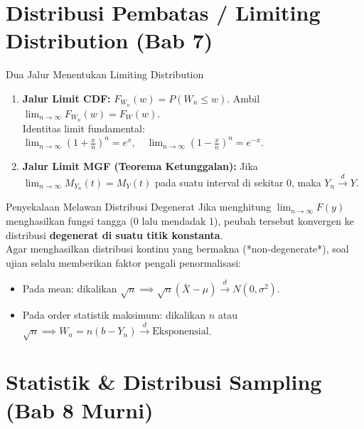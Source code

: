 \documentclass[10pt,twoside]{article}
\begin{document}
\section{Distribusi Pembatas / Limiting Distribution (Bab 7)}

\begin{teoribox}{Dua Jalur Menentukan Limiting Distribution}
\begin{enumerate}
  \item \textbf{Jalur Limit CDF:} $F_{W_n}(w) = P(W_n \le w)$. Ambil $\lim_{n \to \infty} F_{W_n}(w) = F_W(w)$.\\
  Identitas limit fundamental: $\lim_{n \to \infty} \left(1 + \frac{x}{n}\right)^n = e^x, \quad \lim_{n \to \infty} \left(1 - \frac{x}{n}\right)^n = e^{-x}$.
  \item \textbf{Jalur Limit MGF (Teorema Ketunggalan):}
  Jika $\lim_{n \to \infty} M_{Y_n}(t) = M_Y(t)$ pada suatu interval di sekitar 0, maka $Y_n \xrightarrow{d} Y$.
\end{enumerate}
\end{teoribox}

\begin{warningbox}{Penyekalaan Melawan Distribusi Degenerat}
Jika menghitung $\lim_{n \to \infty} F(y)$ menghasilkan fungsi tangga (0 lalu mendadak 1), peubah tersebut konvergen ke distribusi \textbf{degenerat di suatu titik konstanta}.\\
Agar menghasilkan distribusi kontinu yang bermakna (*non-degenerate*), soal ujian selalu memberikan faktor pengali penormalisasi:
\begin{itemize}
  \item Pada mean: dikalikan $\sqrt{n} \implies \sqrt{n}(\bar{X} - \mu) \xrightarrow{d} N(0, \sigma^2)$.
  \item Pada order statistik maksimum: dikalikan $n$ atau $\sqrt{n} \implies W_n = n(b - Y_n) \xrightarrow{d} \text{Eksponensial}$.
\end{itemize}
\end{warningbox}

\section{Statistik \& Distribusi Sampling (Bab 8 Murni)}
\end{document}
